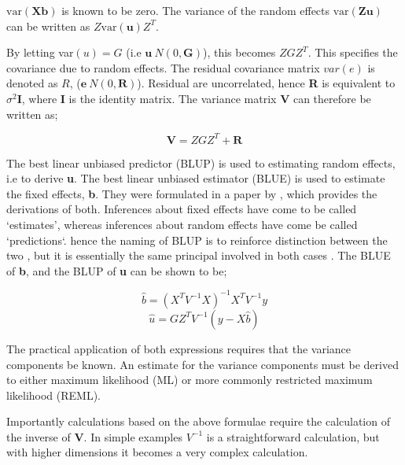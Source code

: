 \documentclass[Chap4main.tex]{subfiles}
\begin{document}
$\mbox{var}(\textbf{Xb})$ is known to be zero. The variance of the
random effects $\mbox{var}(\textbf{Zu})$ can be written as
$Z\mbox{var}(\textbf{u})Z^{T}$.

By letting var$(u) = G$ (i.e $\textbf{u} ~ N(0,\textbf{G})$), this
becomes $ZGZ^{T}$. This specifies the covariance due to random
effects. The residual covariance matrix $var(e)$ is denoted as
$R$, ($\textbf{e} ~ N(0,\textbf{R})$). Residual are uncorrelated,
hence \textbf{R} is equivalent to $\sigma^{2}$\textbf{I}, where
\textbf{I} is the identity matrix. The variance matrix \textbf{V}
can therefore be written as;

\begin{equation}
\textbf{V}  = ZGZ^{T} + \textbf{R}
\end{equation}


The best linear unbiased predictor (BLUP) is used to estimating
random effects, i.e to derive \textbf{u}. The best linear unbiased
estimator (BLUE) is used to estimate the fixed effects,
\textbf{b}. They were formulated in a paper by \cite{Henderson59},
which provides the derivations of both. Inferences about fixed
effects have come to be called `estimates', whereas inferences
about random effects have come be called `predictions`. hence the
naming of BLUP is to reinforce distinction between the two , but
it is essentially the same principal involved in both cases
\citep{Robinson}. The BLUE of \textbf{b}, and the BLUP of
\textbf{u} can be shown to be;

\begin{equation}
\hat{b} = (X^{T}V^{-1}X)^{-1}X^{T}V^{-1}y
\end{equation}
\begin{equation}
\hat{u} = GZ^{T}V^{-1}(y-X\hat{b})
\end{equation}

The practical application of both expressions requires that the
variance components be known. An estimate for the variance
components must be derived to  either maximum likelihood (ML) or
more commonly restricted maximum likelihood (REML).

Importantly calculations based on the above formulae require the
calculation of the inverse of \textbf{V}. In simple examples
$V^{-1}$ is a straightforward calculation, but with higher
dimensions it becomes a very complex calculation.
\newpage
\end{document}
